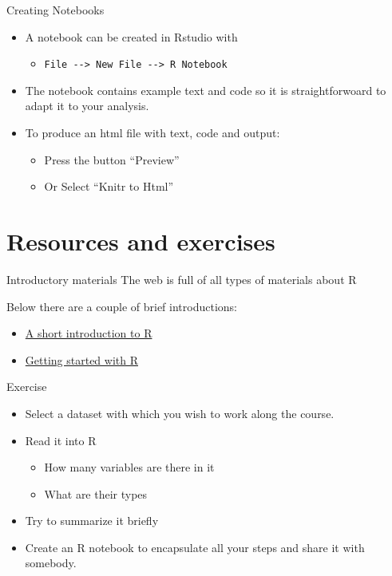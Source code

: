 \documentclass[
  ignorenonframetext,
]{beamer}
\providecommand{\tightlist}{%
  \setlength{\itemsep}{0pt}\setlength{\parskip}{0pt}}
\begin{document}
\begin{frame}[fragile]{Creating Notebooks}
\protect\hypertarget{creating-notebooks}{}
\begin{itemize}
\tightlist
\item
  A notebook can be created in Rstudio with

  \begin{itemize}
  \tightlist
  \item
    \texttt{File\ -\/-\textgreater{}\ New\ File\ -\/-\textgreater{}\ R\ Notebook}
  \end{itemize}
\item
  The notebook contains example text and code so it is straightforwoard
  to adapt it to your analysis.
\item
  To produce an html file with text, code and output:

  \begin{itemize}
  \tightlist
  \item
    Press the button ``Preview''
  \item
    Or Select ``Knitr to Html''
  \end{itemize}
\end{itemize}
\end{frame}

\hypertarget{resources-and-exercises}{%
\section{Resources and exercises}\label{resources-and-exercises}}

\begin{frame}{Introductory materials}
\protect\hypertarget{introductory-materials}{}
The web is full of all types of materials about R

Below there are a couple of brief introductions:

\begin{itemize}
\item
  \href{https://stats.idre.ucla.edu/r/seminars/short-introduction-to-r/}{A
  short introduction to R}
\item
  \href{https://github.com/saghirb/Getting-Started-in-R}{Getting started
  with R}
\end{itemize}
\end{frame}

\begin{frame}{Exercise}
\protect\hypertarget{exercise-1}{}
\begin{itemize}
\tightlist
\item
  Select a dataset with which you wish to work along the course.
\item
  Read it into R

  \begin{itemize}
  \tightlist
  \item
    How many variables are there in it
  \item
    What are their types
  \end{itemize}
\item
  Try to summarize it briefly
\item
  Create an R notebook to encapsulate all your steps and share it with
  somebody.
\end{itemize}
\end{frame}
\end{document}
